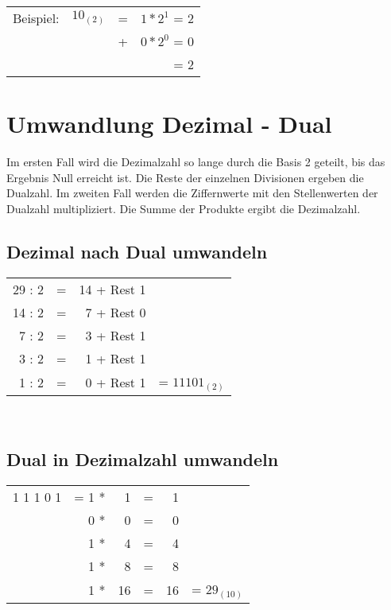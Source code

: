 \begin{minipage}{0.5\textwidth}
\begin{tabular}{llcr}
Beispiel:  & $10_{(2)}$ & = & $1 * 2^1$ = 2 \\
           &            & + & $0 * 2^0$ = 0 \\
           &            &   &           = 2 \\
\end{tabular}
\end{minipage}

\section{Umwandlung Dezimal - Dual}
Im ersten Fall wird die Dezimalzahl so lange durch die Basis 2 geteilt, bis das
Ergebnis Null erreicht ist. Die Reste der einzelnen Divisionen ergeben die
Dualzahl. Im zweiten Fall werden die Ziffernwerte mit den Stellenwerten der
Dualzahl multipliziert. Die Summe der Produkte ergibt die Dezimalzahl.
\\
\subsection{Dezimal nach Dual umwandeln}
\begin{minipage}{0.5\textwidth}
\begin{tabular}{rcrr}
29 : 2 & = & 14 + Rest 1 & \\
14 : 2 & = &  7 + Rest 0 & \\
 7 : 2 & = &  3 + Rest 1 & \\
 3 : 2 & = &  1 + Rest 1 & \\
 1 : 2 & = &  0 + Rest 1 &  =  $11101_{(2)}$ \\
\end{tabular}
\end{minipage}
\\
\subsection{Dual in Dezimalzahl umwandeln}
\begin{minipage}{0.5\textwidth}
\begin{tabular}{lrrcrl}
1 1 1 0 1 & = 1 * &  1 & = &  1 & \\
          &   0 * &  0 & = &  0 & \\
          &   1 * &  4 & = &  4 & \\
          &   1 * &  8 & = &  8 & \\
          &   1 * & 16 & = & 16 &  = $29_{(10)}$ \\
\end{tabular}
\end{minipage}


